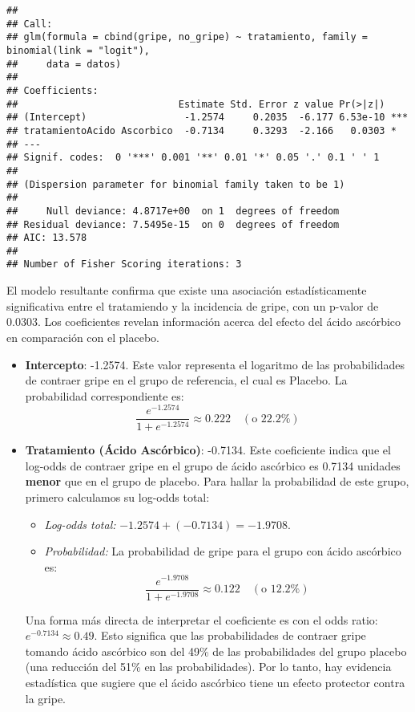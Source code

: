 \documentclass[paper=letter, fontsize=11pt]{scrartcl}\usepackage[]{graphicx}\usepackage[]{xcolor}
\makeatletter
\newenvironment{kframe}{%
 \def\at@end@of@kframe{}%
 \ifinner\ifhmode%
  \def\at@end@of@kframe{\end{minipage}}%
  \begin{minipage}{\columnwidth}%
 \fi\fi%
 \def\FrameCommand##1{\hskip\@totalleftmargin \hskip-\fboxsep
 \colorbox{shadecolor}{##1}\hskip-\fboxsep
     \hskip-\linewidth \hskip-\@totalleftmargin \hskip\columnwidth}%
 \MakeFramed {\advance\hsize-\width
   \@totalleftmargin\z@ \linewidth\hsize
   \@setminipage}}%
 {\par\unskip\endMakeFramed%
 \at@end@of@kframe}
\newenvironment{knitrout}{}{} %
\numberwithin{equation}{problemcounter} %
\numberwithin{figure}{problemcounter} %
\numberwithin{table}{problemcounter} %
\numberwithin{subsection}{problemcounter}
\makeatother
\begin{document}
\begin{knitrout}
\color{fgcolor}\begin{kframe}
\begin{verbatim}
## 
## Call:
## glm(formula = cbind(gripe, no_gripe) ~ tratamiento, family = binomial(link = "logit"), 
##     data = datos)
## 
## Coefficients:
##                            Estimate Std. Error z value Pr(>|z|)    
## (Intercept)                 -1.2574     0.2035  -6.177 6.53e-10 ***
## tratamientoAcido Ascorbico  -0.7134     0.3293  -2.166   0.0303 *  
## ---
## Signif. codes:  0 '***' 0.001 '**' 0.01 '*' 0.05 '.' 0.1 ' ' 1
## 
## (Dispersion parameter for binomial family taken to be 1)
## 
##     Null deviance: 4.8717e+00  on 1  degrees of freedom
## Residual deviance: 7.5495e-15  on 0  degrees of freedom
## AIC: 13.578
## 
## Number of Fisher Scoring iterations: 3
\end{verbatim}
\end{kframe}
\end{knitrout}

El modelo resultante confirma que existe una asociación estadísticamente significativa entre el tratamiendo y la incidencia de gripe, con un p-valor de 0.0303. Los coeficientes revelan información acerca del efecto del ácido ascórbico en comparación con el placebo.

\begin{itemize}
    \item \textbf{Intercepto}: -1.2574. Este valor representa el logaritmo de las probabilidades de contraer gripe en el grupo de referencia, el cual es Placebo. La probabilidad correspondiente es:
    $$ \frac{e^{-1.2574}}{1 + e^{-1.2574}} \approx 0.222 \quad (\text{o 22.2\%}) $$

    \item \textbf{Tratamiento (Ácido Ascórbico)}: -0.7134. Este coeficiente indica que el log-odds de contraer gripe en el grupo de ácido ascórbico es 0.7134 unidades \textbf{menor} que en el grupo de placebo. Para hallar la probabilidad de este grupo, primero calculamos su log-odds total:
    \begin{itemize}
        \item \textit{Log-odds total:} $-1.2574 + (-0.7134) = -1.9708$.
        \item \textit{Probabilidad:} La probabilidad de gripe para el grupo con ácido ascórbico es:
              $$ \frac{e^{-1.9708}}{1 + e^{-1.9708}} \approx 0.122 \quad (\text{o 12.2\%}) $$
    \end{itemize}
    Una forma más directa de interpretar el coeficiente es con el odds ratio: $e^{-0.7134} \approx 0.49$. Esto significa que las probabilidades de contraer gripe tomando ácido ascórbico son del 49\% de las probabilidades del grupo placebo (una reducción del 51\% en las probabilidades). Por lo tanto, hay evidencia estadística que sugiere que el ácido ascórbico tiene un efecto protector contra la gripe.
\end{itemize}


\end{document}
